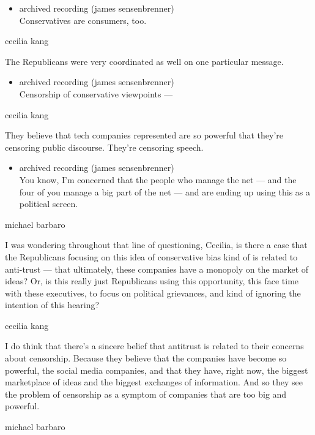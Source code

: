 \begin{itemize}
\tightlist
\item
  archived recording (james sensenbrenner)\\
  Conservatives are consumers, too.
\end{itemize}

cecilia kang

The Republicans were very coordinated as well on one particular message.

\begin{itemize}
\tightlist
\item
  archived recording (james sensenbrenner)\\
  Censorship of conservative viewpoints ---
\end{itemize}

cecilia kang

They believe that tech companies represented are so powerful that
they're censoring public discourse. They're censoring speech.

\begin{itemize}
\tightlist
\item
  archived recording (james sensenbrenner)\\
  You know, I'm concerned that the people who manage the net --- and the
  four of you manage a big part of the net --- and are ending up using
  this as a political screen.
\end{itemize}

michael barbaro

I was wondering throughout that line of questioning, Cecilia, is there a
case that the Republicans focusing on this idea of conservative bias
kind of is related to anti-trust --- that ultimately, these companies
have a monopoly on the market of ideas? Or, is this really just
Republicans using this opportunity, this face time with these
executives, to focus on political grievances, and kind of ignoring the
intention of this hearing?

cecilia kang

I do think that there's a sincere belief that antitrust is related to
their concerns about censorship. Because they believe that the companies
have become so powerful, the social media companies, and that they have,
right now, the biggest marketplace of ideas and the biggest exchanges of
information. And so they see the problem of censorship as a symptom of
companies that are too big and powerful.

michael barbaro

